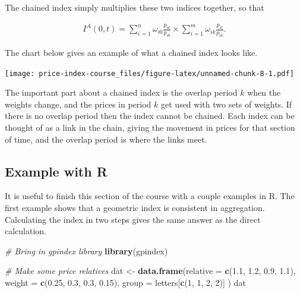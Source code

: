 \documentclass[]{article}
\newenvironment{Shaded}{\begin{snugshade}}{\end{snugshade}}
\newcommand{\CommentTok}[1]{\textcolor[rgb]{0.56,0.35,0.01}{\textit{#1}}}
\newcommand{\DataTypeTok}[1]{\textcolor[rgb]{0.13,0.29,0.53}{#1}}
\newcommand{\DecValTok}[1]{\textcolor[rgb]{0.00,0.00,0.81}{#1}}
\newcommand{\FloatTok}[1]{\textcolor[rgb]{0.00,0.00,0.81}{#1}}
\newcommand{\KeywordTok}[1]{\textcolor[rgb]{0.13,0.29,0.53}{\textbf{#1}}}
\newcommand{\NormalTok}[1]{#1}
\newcommand{\StringTok}[1]{\textcolor[rgb]{0.31,0.60,0.02}{#1}}
\begin{document}
The chained index simply multiplies these two indices together, so that

\begin{align*}
I^{A}(0, t) = \sum_{i = 1}^{n} \omega_{i0} \frac{p_{ik}}{p_{i0}} \times \sum_{i = 1}^{m} \omega_{ik} \frac{p_{it}}{p_{ik}}.
\end{align*}

The chart below gives an example of what a chained index looks like.

\texttt{[image: price-index-course\_files/figure-latex/unnamed-chunk-8-1.pdf]}

The important part about a chained index is the overlap period \(k\) when the weights change, and the prices in period \(k\) get used with two sets of weights. If there is no overlap period then the index cannot be chained. Each index can be thought of as a link in the chain, giving the movement in prices for that section of time, and the overlap period is where the links meet.

\hypertarget{example-with-r-1}{%
\subsection{Example with R}\label{example-with-r-1}}

It is useful to finish this section of the course with a couple examples in R. The first example shows that a geometric index is consistent in aggregation. Calculating the index in two steps gives the same answer as the direct calculation.

\begin{Shaded}
\begin{Highlighting}[]
\CommentTok{# Bring in gpindex library}
\KeywordTok{library}\NormalTok{(gpindex)}

\CommentTok{# Make some price relatives}
\NormalTok{dat <-}\StringTok{ }\KeywordTok{data.frame}\NormalTok{(}\DataTypeTok{relative =} \KeywordTok{c}\NormalTok{(}\FloatTok{1.1}\NormalTok{, }\FloatTok{1.2}\NormalTok{, }\FloatTok{0.9}\NormalTok{, }\FloatTok{1.1}\NormalTok{),}
                  \DataTypeTok{weight =} \KeywordTok{c}\NormalTok{(}\FloatTok{0.25}\NormalTok{, }\FloatTok{0.3}\NormalTok{, }\FloatTok{0.3}\NormalTok{, }\FloatTok{0.15}\NormalTok{),}
                  \DataTypeTok{group =}\NormalTok{ letters[}\KeywordTok{c}\NormalTok{(}\DecValTok{1}\NormalTok{, }\DecValTok{1}\NormalTok{, }\DecValTok{2}\NormalTok{, }\DecValTok{2}\NormalTok{)]}
\NormalTok{)}
\NormalTok{dat}
\end{Highlighting}
\end{Shaded}
\end{document}
